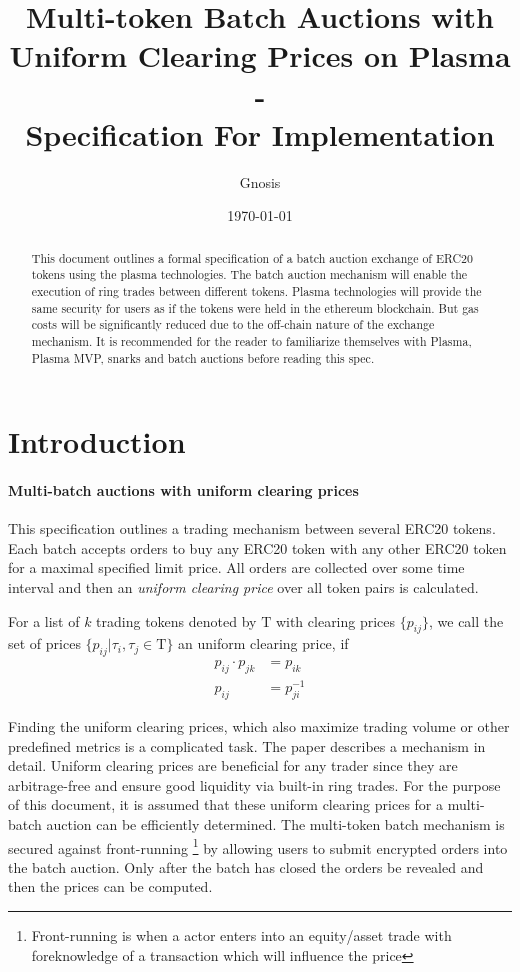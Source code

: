 \documentclass[11pt,parskip=full]{scrartcl}%
\title{
  Multi-token Batch Auctions with Uniform Clearing Prices on Plasma\\
  - \\
  \Large Specification For Implementation}
\author{Gnosis}
\date{\today}
\newcommand{\Tau}{\mathrm{T}}
\newcommand*{\erc}{ERC20 }
\begin{document}
\maketitle


\begin{abstract}

This document outlines a formal specification of a batch auction exchange of ERC20 tokens using the plasma technologies. 
The batch auction mechanism will enable the execution of ring trades between different tokens. 
Plasma technologies will provide the same security for users as if the tokens were held in the ethereum blockchain. 
But gas costs will be significantly reduced due to the off-chain nature of the exchange mechanism. 
It is recommended for the reader to familiarize themselves with Plasma\cite{plasma}, Plasma MVP\cite{MVP}, snarks\cite{snarks} and batch auctions\cite{batch} before reading this spec. 

\end{abstract}

\tableofcontents

\newpage
\section{Introduction}
\label{sec:introduction}

\paragraph{Multi-batch auctions with uniform clearing prices}

This specification outlines a trading mechanism between several \erc tokens. Each batch accepts orders to buy any \erc token with any other \erc token for a maximal specified limit price. All orders are collected over some time interval and then an \emph{uniform clearing price} over all token pairs is calculated. 

For a list of $k$ trading tokens denoted by $\Tau$ with clearing prices $\{p_{ij}\}$, we call the set of prices $\{p_{ij}| \tau_i, \tau_j \in \Tau\}$ an uniform clearing price, if
\begin{align} \label{arbitrage_free}
  p_{ij} \cdot p_{jk} &= p_{ik}\\
  p_{ij} &= p_{ji}^{-1}
\end{align}


Finding the uniform clearing prices, which also maximize trading volume or other predefined metrics is a complicated task. The paper \cite{priceOptimization} describes a mechanism in detail. Uniform clearing prices are beneficial for any trader since they are arbitrage-free and ensure good liquidity via built-in ring trades. For the purpose of this document, it is assumed that these uniform clearing prices for a multi-batch auction can be efficiently determined. \newline
The multi-token batch mechanism is secured against front-running \footnote{Front-running is when a actor enters into an equity/asset trade with foreknowledge of a transaction which will influence the price} by allowing users to submit encrypted orders into the batch auction. Only after the batch has closed the orders be revealed and then the prices can be computed. 
\end{document}

